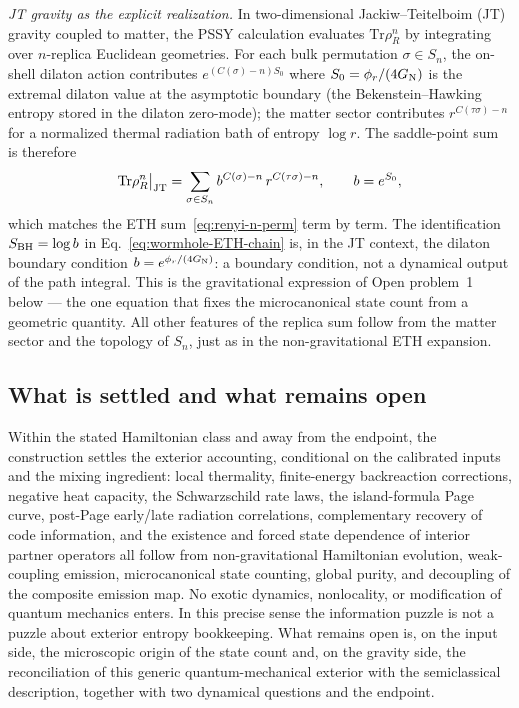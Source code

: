 \documentclass[12pt]{article}
\newcommand{\Tr}{\mathrm{Tr}}
\begin{document}
\smallskip\noindent\emph{JT gravity as the explicit realization.}
In two-dimensional Jackiw--Teitelboim (JT) gravity coupled to matter, the
PSSY calculation \cite{PeningtonShenkerStanfordYang2022} evaluates
$\Tr\rho_R^n$ by integrating over $n$-replica Euclidean geometries.  For
each bulk permutation $\sigma\in S_n$, the on-shell dilaton action
contributes $e^{(C(\sigma)-n)S_0}$ where $S_0=\phi_r/(4G_{\rm N})$ is the
extremal dilaton value at the asymptotic boundary (the Bekenstein--Hawking
entropy stored in the dilaton zero-mode); the matter sector contributes
$r^{C(\tau\sigma)-n}$ for a normalized thermal radiation bath of entropy
$\log r$.  The saddle-point sum is therefore
\begin{equation}\label{eq:JT-saddle-sum}
  \Tr\rho_R^n\big|_{\rm JT}
  = \sum_{\sigma\in S_n} b^{C(\sigma)-n}\,r^{C(\tau\sigma)-n},
  \qquad b=e^{S_0},
\end{equation}
which matches the ETH sum~\eqref{eq:renyi-n-perm} term by term.  The
identification $S_{\rm BH}=\log b$ in Eq.~\eqref{eq:wormhole-ETH-chain}
is, in the JT context, the dilaton boundary condition
$b=e^{\phi_r/(4G_{\rm N})}$: a boundary condition, not a dynamical output
of the path integral.  This is the gravitational expression of
Open problem~1 below --- the one equation that fixes the microcanonical
state count from a geometric quantity.  All other features of the replica
sum follow from the matter sector and the topology of $S_n$, just as in
the non-gravitational ETH expansion.

\subsection{What is settled and what remains open}
\label{sec:open-problems}

Within the stated Hamiltonian class and away from the endpoint, the
construction settles the exterior accounting, conditional on the calibrated
inputs and the mixing ingredient: local thermality, finite-energy
backreaction corrections, negative heat capacity, the Schwarzschild rate
laws, the island-formula Page curve, post-Page early/late radiation
correlations, complementary recovery of code information, and the existence
and forced state dependence of interior partner operators all follow from
non-gravitational Hamiltonian evolution, weak-coupling emission,
microcanonical state counting, global purity, and decoupling of the composite
emission map.  No exotic dynamics, nonlocality, or modification of quantum
mechanics enters.  In this precise sense the information puzzle is not a
puzzle about exterior entropy bookkeeping.  What remains open is, on the
input side, the microscopic origin of the state count and, on the gravity
side, the reconciliation of this generic quantum-mechanical exterior with the
semiclassical description, together with two dynamical questions and the
endpoint.
\end{document}
